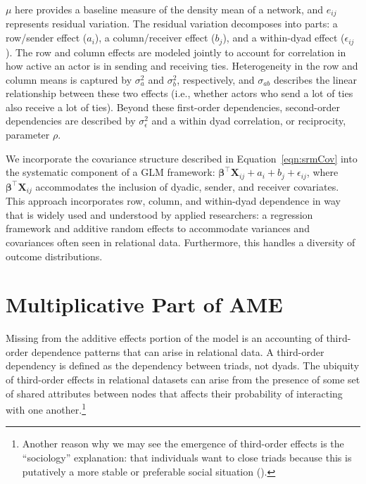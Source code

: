 \documentclass[12pt,pdflatex]{elsarticle}
\begin{document}
$\mu$ here provides a baseline measure of the density mean of a network, and $e_{ij}$ represents residual variation. The residual variation decomposes into parts: a row/sender effect ($a_{i}$), a column/receiver effect ($b_{j}$), and a within-dyad effect ($\epsilon_{ij}$). The row and column effects are modeled jointly to account for correlation in how active an actor is in sending and receiving ties. Heterogeneity in the row and column means is captured by $\sigma_{a}^{2}$ and $\sigma_{b}^{2}$, respectively, and $\sigma_{ab}$ describes the linear relationship between these two effects (i.e., whether actors who send  a lot of ties also receive  a lot of ties). Beyond these first-order dependencies, second-order dependencies are described by $\sigma_{\epsilon}^{2}$ and a within dyad correlation, or reciprocity, parameter $\rho$. 

We incorporate the covariance structure described in Equation~\ref{eqn:srmCov} into the systematic component of a GLM framework: $\bm\beta^{\top} \mathbf{X}_{ij} + a_{i} + b_{j} + \epsilon_{ij}$, where $ \bm\beta^{\top} \mathbf{X}_{ij}$ accommodates the inclusion of dyadic, sender, and receiver covariates. This approach incorporates row, column, and within-dyad dependence in way that is widely used and understood by applied researchers: a regression framework and additive random effects to accommodate variances and covariances often seen in relational data. Furthermore, this handles a diversity of outcome distributions. 

\section*{Multiplicative Part of AME}

Missing from the additive effects portion of the model is an accounting of third-order dependence patterns that can arise in relational data. A third-order dependency is defined as the dependency between triads, not dyads. The ubiquity of third-order effects in relational datasets can arise from the presence of some set of shared attributes between nodes that affects their probability of interacting with one another.\footnote{Another reason why we may see the emergence of third-order effects is the ``sociology'' explanation: that individuals want to close triads because this is putatively a more stable or preferable social situation (\citealt{wasserman:faust:1994}).}
\end{document}
